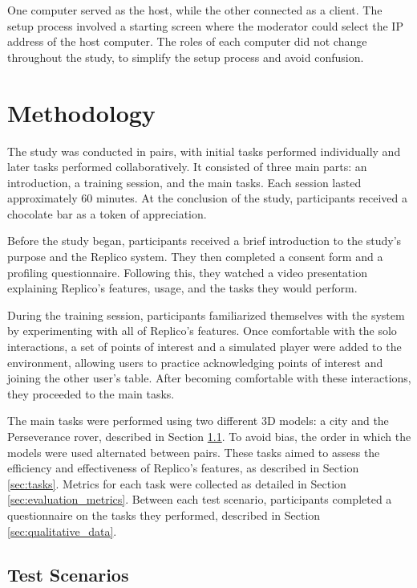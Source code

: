     One computer served as the host, while the other connected as a client. The setup process involved a starting screen where the moderator could select the IP address of the host computer. The roles of each computer did not change throughout the study, to simplify the setup process and avoid confusion.

\section{Methodology}

    The study was conducted in pairs, with initial tasks performed individually and later tasks performed collaboratively. It consisted of three main parts: an introduction, a training session, and the main tasks. Each session lasted approximately 60 minutes. At the conclusion of the study, participants received a chocolate bar as a token of appreciation.

    Before the study began, participants received a brief introduction to the study's purpose and the Replico system. They then completed a consent form and a profiling questionnaire. Following this, they watched a video presentation explaining Replico's features, usage, and the tasks they would perform.

    During the training session, participants familiarized themselves with the system by experimenting with all of Replico's features. Once comfortable with the solo interactions, a set of points of interest and a simulated player were added to the environment, allowing users to practice acknowledging points of interest and joining the other user's table. After becoming comfortable with these interactions, they proceeded to the main tasks.

    The main tasks were performed using two different 3D models: a city and the Perseverance rover, described in Section \ref{sec:test_scenarios}. To avoid bias, the order in which the models were used alternated between pairs. These tasks aimed to assess the efficiency and effectiveness of Replico's features, as described in Section \ref{sec:tasks}. Metrics for each task were collected as detailed in Section \ref{sec:evaluation_metrics}. Between each test scenario, participants completed a questionnaire on the tasks they performed, described in Section \ref{sec:qualitative_data}.


    \subsection{Test Scenarios} \label{sec:test_scenarios}

